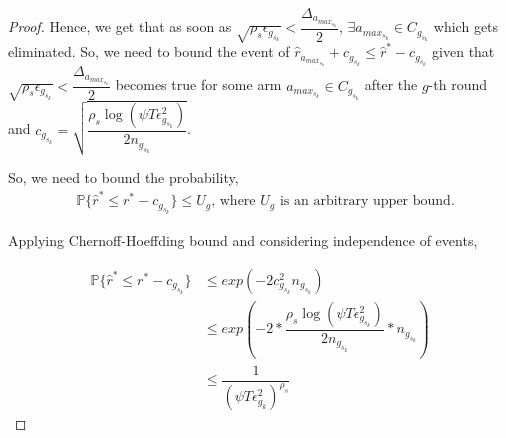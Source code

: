 \begin{proof}
 	Hence, we get that as soon as $\sqrt{\rho_{s}\epsilon_{g_{s_{k}}}}<\dfrac{\Delta_{a_{max_{s_{k}}}}}{2}$, $\exists a_{max_{s_{k}}}\in C_{g_{s_{k}}}$ which gets eliminated.
  So, we need to bound the event of $\hat{r}_{a_{max_{s_{k}}}}+c_{g_{s_{k}}}\leq \hat{r}^{*}-c_{g_{s_{k}}}$ given that $\sqrt{\rho_{s}\epsilon_{g_{s_{k}}}}<\dfrac{\Delta_{a_{max_{s_{k}}}}}{2}$ becomes true for some arm $a_{max_{s_{k}}}\in C_{g_{s_{k}}}$ after the $g$-th round and $c_{g_{s_{k}}}=\sqrt{\dfrac{\rho_{s} \log (\psi T\epsilon_{g_{s_{k}}}^{2})}{2 n_{g_{s_{k}}}}}$.

% 
	So, we need to bound the probability,
	\begin{align*}
	&\mathbb{P}\lbrace\hat{r}^{*}\leq r^{*} - c_{g_{s_{k}}}\rbrace\leq U_{g}\text{, where $U_{g}$ is an  arbitrary upper bound.}
	\end{align*}
 
Applying Chernoff-Hoeffding bound and considering independence of events,
 
 \begin{align*}
 \mathbb{P}\lbrace\hat{r}^{*} \leq r^{*} - c_{g_{s_{k}}}\rbrace&\leq exp(-2c_{g_{s_{k}}}^{2}n_{g_{s_{k}}})\\
 &\leq exp(-2 * \dfrac{\rho_{s}\log ( \psi T\epsilon_{g_{s_{k}}}^{2})}{2 n_{g_{s_{k}}}} *n_{g_{s_{k}}})\\
 &\leq \dfrac{1}{(\psi T\epsilon_{g_{k}}^{2})^{\rho_{s}}}
 \end{align*}


\end{proof}
